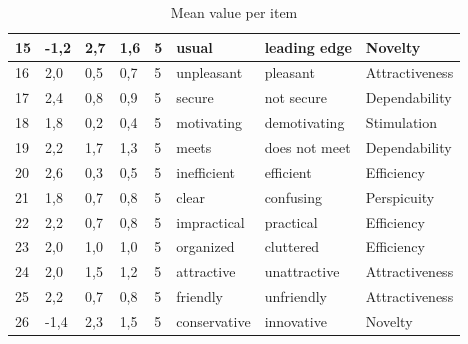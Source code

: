 \documentclass[conference,onecolumn]{IEEEtran}
\begin{document}
\begin{table}[H]
\begin{center}
\begin{tabular}[H]{ |m{1cm}|m{1cm}|m{1.2cm}|m{1.2cm}|m{1cm}|m{2cm}|m{3cm}|m{2cm}|}
                15	&-1,2	&2,7	&1,6	&5	&usual	                &leading edge	            &Novelty        \\ \hline
                16	&2,0	&0,5	&0,7	&5	&unpleasant	            &pleasant	                &Attractiveness     \\ \hline
                17	&2,4	&0,8	&0,9	&5	&secure	                &not secure	                &Dependability      \\ \hline
                18	&1,8	&0,2	&0,4	&5	&motivating	            &demotivating	            &Stimulation        \\ \hline
                19	&2,2	&1,7	&1,3	&5	&meets			        &does not meet				&Dependability      \\ \hline
                20	&2,6	&0,3	&0,5	&5	&inefficient	        &efficient	                &Efficiency     \\ \hline
                21	&1,8	&0,7	&0,8	&5	&clear	                &confusing	                &Perspicuity        \\ \hline
                22	&2,2	&0,7	&0,8	&5	&impractical	        &practical	                &Efficiency     \\ \hline
                23	&2,0	&1,0	&1,0	&5	&organized	            &cluttered	                &Efficiency     \\ \hline
                24	&2,0	&1,5	&1,2	&5	&attractive	            &unattractive	            &Attractiveness     \\ \hline
                25	&2,2	&0,7	&0,8	&5	&friendly	            &unfriendly	                &Attractiveness     \\ \hline
                26	&-1,4	&2,3	&1,5	&5	&conservative	        &innovative	                &Novelty        \\ 
                \hline
            \end{tabular}
        \end{center}
        \caption{Mean value per item}
        \label{table:Mean value per item}
    \end{table}


\newpage


\end{document}
